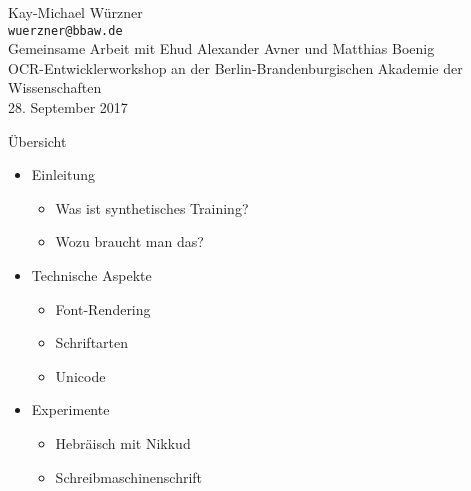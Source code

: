 \documentclass{bbawslides}
\begin{document}
\providecommand{\Title}{}


\begin{bbawtitle}
  \vspace*{2em}%
  Kay-Michael Würzner\\[-.25em]%
  \textcolor{urlColor}{\texttt{{\small wuerzner@bbaw.de}}}
  \\[0.5em]
  {\small Gemeinsame Arbeit mit Ehud Alexander Avner und Matthias Boenig}
  \\[1.5em]
  {\footnotesize{%
    OCR-Entwicklerworkshop an der Berlin-Brandenburgischen Akademie der Wissenschaften\\%
    28. September 2017\\%
  }}
\end{bbawtitle}
\slideStyleFrame

\renewcommand{\footerText}{\tiny 28. September 2017, OCR-Entwicklerworkshop, BBAW}

\begin{bbawslide}{Übersicht}
  \vspace*{7mm}%
  \centerslidestrue%
  \begin{itemize}
    \item Einleitung
    \begin{itemize}\small
      \item Was ist synthetisches Training?
      \item Wozu braucht man das?
    \end{itemize}
    \item Technische Aspekte
    \begin{itemize}\small
      \item Font-Rendering
      \item Schriftarten
      \item Unicode
    \end{itemize}
    \item Experimente
    \begin{itemize}\small
      \item Hebräisch mit Nikkud
      \item Schreibmaschinenschrift
    \end{itemize}
  \end{itemize}
\end{bbawslide}
\end{document}
